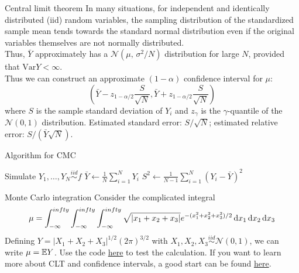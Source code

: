 \documentclass{beamer}
\begin{document}
\begin{frame}{Central limit theorem}
    In many situations, for independent and identically distributed (iid) random variables, the sampling distribution of the standardized sample mean tends towards the standard normal distribution even if the original variables themselves are not normally distributed.
    \\[10pt]
    Thus, $\bar{Y}$ approximately has a $\mathcal{N}(\mu,\,\sigma^{2}/N)$ distribution for large $N$, provided that $\mathrm{Var} Y < \infty$.
    \\[10pt]
    Thus we can construct an approximate $(1-\alpha)$ confidence interval for $\mu$:
    \[
        \left(\bar{Y}-z_{1-\alpha/2}\frac{S}{\sqrt{N}}, \bar{Y}+z_{1-\alpha/2}\frac{S}{\sqrt{N}}\right)    
    \]
    where $S$ is the sample standard deviation of ${Y_i}$ and $z_{\gamma}$ is the $\gamma$-quantile of the $\mathcal{N}(0,1)$ distribution. Estimated standard error: $S/\sqrt{N}$; estimated relative error: $S/(\bar{Y}\sqrt{N})$.
\end{frame}

\begin{frame}[fragile]{Algorithm for CMC}
    \begin{algorithm}[H]
        \DontPrintSemicolon
          
        Simulate $Y_1,\ldots,Y_N \stackrel{iid}{\sim}f$\;
        $\bar{Y}\leftarrow \frac{1}{N}\sum_{i=1}^N Y_i$\;
        $S^2 \leftarrow \frac{1}{N-1}\sum_{i=1}^N (Y_i-\bar{Y})^2$\;
        \;
        \caption{CMC for iid}
        \end{algorithm}
\end{frame}

\begin{frame}{Monte Carlo integration}
    Consider the complicated integral
    \[
        \mu = \int_{-\infty}^{infty}  \int_{-\infty}^{infty} \int_{-\infty}^{infty} \sqrt{|x_1+x_2+x_3|} e^{-(x_1^2+x_2^2+x_3^2)/2} \mathop{}\!\mathrm{d} x_1 \mathop{}\!\mathrm{d} x_2 \mathop{}\!\mathrm{d} x_3  
    \]
    Defining $Y=|X_1+X_2+X_3|^{1/2}(2\pi)^{3/2}$ with $X_1,X_2,X_3 \stackrel{iid}{\sim} \mathcal{N}(0,1)$, we can write $\mu=\mathbb{E} Y$.
    Use the code \href{https://biocomputing-teaching.github.io/Data-Science-with-Python/code/UNIT3-MC-Methods.html}{here} to test the calculation. If you want to learn more about CLT and confidence intervals, a good start can be found \href{https://online.stat.psu.edu/stat506/lesson/1/1.4}{here}.
\end{frame}
\end{document}

